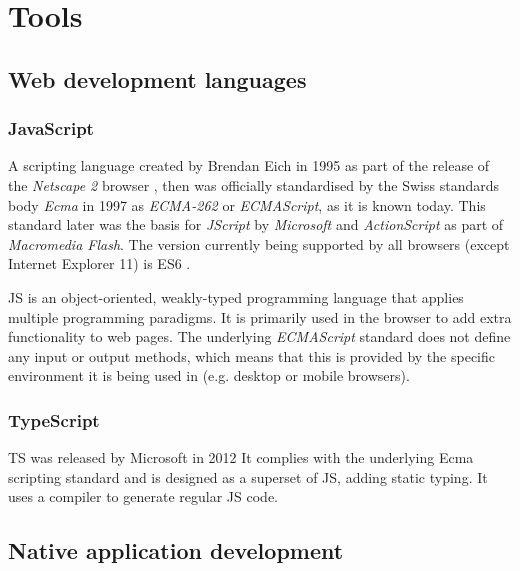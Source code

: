 \chapter{Tools}
\label{chapter:tools}


\section{Web development languages}



\subsection{JavaScript}

A scripting language created by Brendan Eich in 1995 as part of the release of the \emph{Netscape 2} browser \parencite{javascriptRelease}, then was officially standardised by the Swiss standards body \emph{Ecma} in 1997 as \emph{ECMA-262} or \emph{ECMAScript}, as it is known today. This standard later was the basis for \emph{JScript} by \emph{Microsoft} and \emph{ActionScript} as part of \emph{Macromedia Flash}. The version currently being supported by all browsers (except Internet Explorer 11) is \ac{ES6} \parencite{javascriptHistory}.

\ac{JS} is an object-oriented, weakly-typed programming language that applies multiple programming paradigms. It is primarily used in the browser to add extra functionality to web pages. The underlying \emph{ECMAScript} standard does not define any input or output methods, which means that this is provided by the specific environment it is being used in (e.g. desktop or mobile browsers).

\subsection{TypeScript}

\ac{TS} was released by Microsoft in 2012  It complies with the underlying Ecma scripting standard and is designed as a superset of \ac{JS}, adding static typing. It uses a compiler to generate regular \ac{JS} code.


\section{Native application development}

